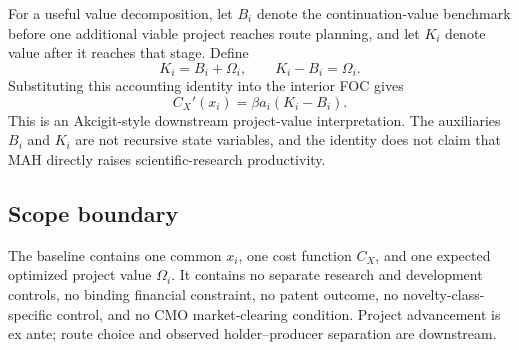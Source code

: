 For a useful value decomposition, let \(B_i\) denote the continuation-value
benchmark before one additional viable project reaches route planning, and
let \(K_i\) denote value after it reaches that stage. Define
\begin{equation}
  K_i=B_i+\Omega_i,
  \qquad
  K_i-B_i=\Omega_i.
  \label{eq:p05-value-gap}
\end{equation}
Substituting this accounting identity into the interior FOC gives
\begin{equation}
  C_X'(x_i)
  =
  \beta a_i(K_i-B_i).
  \label{eq:p05-value-gap-foc}
\end{equation}
This is an Akcigit-style downstream project-value interpretation. The
auxiliaries \(B_i\) and \(K_i\) are not recursive state variables, and the
identity does not claim that MAH directly raises scientific-research
productivity.

\subsection{Scope boundary}
\label{subsec:p05-scope}

The baseline contains one common \(x_i\), one cost function \(C_X\), and one
expected optimized project value \(\Omega_i\). It contains no separate
research and development controls, no binding financial constraint, no
patent outcome, no novelty-class-specific control, and no CMO market-clearing
condition. Project advancement is ex ante; route choice and observed
holder--producer separation are downstream.
